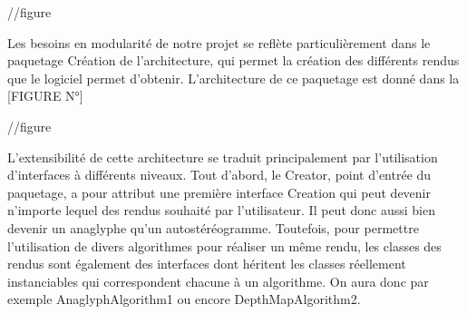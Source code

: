 //figure

Les besoins en modularité de notre projet se reflète particulièrement dans le paquetage Création de l'architecture, qui permet la création des différents rendus que le logiciel permet d'obtenir. L'architecture de ce paquetage est donné dans la [FIGURE N°]

//figure

L'extensibilité de cette architecture se traduit principalement par l'utilisation d'interfaces à différents niveaux. Tout d'abord, le Creator, point d'entrée du paquetage, a pour attribut une première interface Creation qui peut devenir n'importe lequel des rendus souhaité par l'utilisateur. Il peut donc aussi bien devenir un anaglyphe qu'un autostéréogramme. Toutefois, pour permettre l'utilisation de divers algorithmes pour réaliser un même rendu, les classes des rendus sont également des interfaces dont héritent les classes réellement instanciables qui correspondent chacune à un algorithme. On aura donc par exemple AnaglyphAlgorithm1 ou encore DepthMapAlgorithm2.
